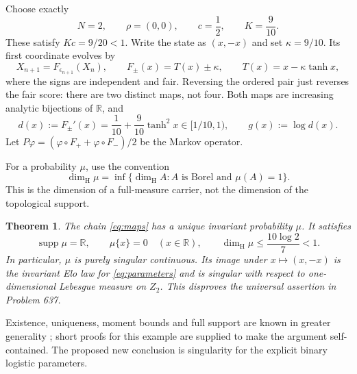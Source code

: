 \documentclass[11pt]{article}
\newtheorem{theorem}{Theorem}[section]
\theoremstyle{remark}
\newcommand{\R}{\mathbb R}
\newcommand{\supp}{\operatorname{supp}}
\newcommand{\dimH}{\operatorname{dim}_{\mathrm H}}
\begin{document}
Choose exactly
\begin{equation}\label{eq:parameters}
N=2,\qquad \rho=(0,0),\qquad c=\frac12,\qquad K=\frac9{10}.
\end{equation}
These satisfy $Kc=9/20<1$. Write the state as $(x,-x)$ and set $\kappa=9/10$. Its first coordinate evolves by
\begin{equation}\label{eq:maps}
X_{n+1}=F_{\epsilon_{n+1}}(X_n),\qquad
F_\pm(x)=T(x)\pm\kappa,\qquad T(x)=x-\kappa\tanh x,
\end{equation}
where the signs are independent and fair. Reversing the ordered pair just reverses the fair score: there are two distinct maps, not four. Both maps are increasing analytic bijections of $\R$, and
\begin{equation}\label{eq:derivative}
d(x):=F_\pm'(x)=\frac1{10}+\frac9{10}\tanh^2 x\in[1/10,1),
\qquad g(x):=\log d(x).
\end{equation}
Let $P\varphi=(\varphi\circ F_++\varphi\circ F_-)/2$ be the Markov operator.

For a probability $\mu$, use the convention
\[
\dimH\mu=\inf\{\dimH A:A\text{ is Borel and }\mu(A)=1\}.
\]
This is the dimension of a full-measure carrier, not the dimension of the topological support.

\begin{theorem}\label{thm:main}
The chain \eqref{eq:maps} has a unique invariant probability $\mu$. It satisfies
\[
\supp\mu=\R,\qquad \mu\{x\}=0\quad(x\in\R),\qquad
\dimH\mu\le\frac{10\log2}{7}<1.
\]
In particular, $\mu$ is purely singular continuous. Its image under $x\mapsto(x,-x)$ is the invariant Elo law for \eqref{eq:parameters} and is singular with respect to one-dimensional Lebesgue measure on $Z_2$. This disproves the universal assertion in Problem 637.
\end{theorem}

Existence, uniqueness, moment bounds and full support are known in greater generality \cite{ct}; short proofs for this example are supplied to make the argument self-contained. The proposed new conclusion is singularity for the explicit binary logistic parameters.
\end{document}
